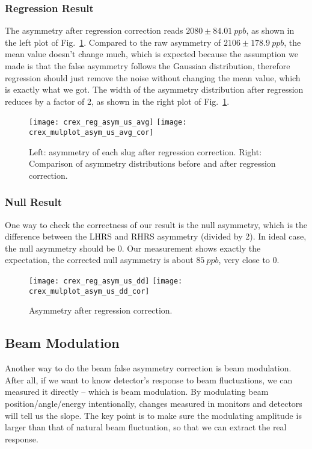 \subsubsection{Regression Result}
The asymmetry after regression correction reads $2080 \pm 84.01\ ppb$, as shown 
in the left plot of Fig.~\ref{fig:reg_asym_us_avg}. Compared to the raw asymmetry
of $2106 \pm 178.9\ ppb$,
the mean value doesn't change much, which is expected because the assumption 
we made is that the false asymmetry follows the Gaussian distribution, therefore
regression should just remove the noise without changing the mean value, which
is exactly what we got. The width of the asymmetry distribution after regression
reduces by a factor of 2, as shown in the right plot of Fig.~\ref{fig:reg_asym_us_avg}.

\begin{figure}[H]
    \centering
    \texttt{[image: crex\_reg\_asym\_us\_avg]}
    \texttt{[image: crex\_mulplot\_asym\_us\_avg\_cor]}
    \caption{Left: asymmetry of each slug after regression correction.
    Right: Comparison of asymmetry distributions before and after regression correction.}
    \label{fig:reg_asym_us_avg}
\end{figure}

\subsubsection{Null Result}
One way to check the correctness of our result is the null asymmetry, which
is the difference between the LHRS and RHRS asymmetry (divided by 2). 
In ideal case, the null asymmetry should be 0. Our measurement shows exactly
the expectation, the corrected null asymmetry is about $85\ ppb$, very close
to 0.
\begin{figure}[H]
    \centering
    \texttt{[image: crex\_reg\_asym\_us\_dd]}
    \texttt{[image: crex\_mulplot\_asym\_us\_dd\_cor]}
    \caption{Asymmetry after regression correction.}
    \label{fig:reg_asym_us_dd}
\end{figure}

\subsection{Beam Modulation}
Another way to do the beam false asymmetry correction is beam modulation. After
all, if we want to know detector's response to beam fluctuations, we can measured
it directly -- which is beam modulation. By modulating beam position/angle/energy
intentionally, changes measured in monitors and detectors will tell us the slope.
The key point is to make sure the modulating amplitude is larger than that of 
natural beam fluctuation, so that we can extract the real response.

